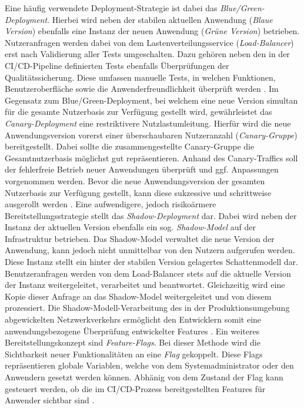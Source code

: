 Eine häufig verwendete Deployment-Strategie ist dabei das \textit{Blue/Green-Deployment}. Hierbei wird neben der stabilen aktuellen Anwendung (\textit{Blaue Version}) ebenfalls eine Instanz der neuen Anwendung (\textit{Grüne Version}) betrieben. Nutzeranfragen werden dabei von dem Lastenverteilungsservice (\textit{Load-Balancer}) erst nach Validierung aller Tests umgeschalten. Dazu gehören neben den in der CI/CD-Pipeline definierten Tests ebenfalls Überprüfungen der Qualitätssicherung. Diese umfassen manuelle Tests, in welchen Funktionen, Benutzeroberfläche sowie die Anwenderfreundlichkeit überprüft werden \cite{Ugochi.20220503}. Im Gegensatz zum Blue/Green-Deployment, bei welchem eine neue Version simultan für die gesamte Nutzerbasis zur Verfügung gestellt wird, gewährleistet das \textit{Canary-Deployment} eine restriktivere Nutzlastumleitung. Hierfür wird die neue Anwendungsversion vorerst einer überschaubaren Nutzeranzahl (\textit{Canary-Gruppe}) bereitgestellt. Dabei sollte die zusammengestellte Canary-Gruppe die Gesamtnutzerbasis möglichst gut repräsentieren. Anhand des Canary-Traffics soll der fehlerfreie Betrieb neuer Anwendungen überprüft und ggf. Anpassungen vorgenommen werden. Bevor die neue Anwendungsversion der gesamten Nutzerbasis zur Verfügung gestellt, kann diese sukzessive und schrittweise ausgerollt werden \cite{Ugochi.20220503}. Eine aufwendigere, jedoch risikoärmere Bereitstellungsstrategie stellt das \textit{Shadow-Deployment} dar. Dabei wird neben der Instanz der aktuellen Version ebenfalls ein sog. \textit{Shadow-Model} auf der Infrastruktur betrieben. Das Shadow-Model verwaltet die neue Version der Anwendung, kann jedoch nicht unmittelbar von den Nutzern aufgerufen werden. Diese Instanz stellt ein hinter der stabilen Version gelagertes Schattenmodell dar. Benutzeranfragen werden von dem Load-Balancer stets auf die aktuelle Version der Instanz weitergeleitet, verarbeitet und beantwortet. Gleichzeitig wird eine Kopie dieser Anfrage an das Shadow-Model weitergeleitet und von diesem prozessiert. Die Shadow-Modell-Verarbeitung des in der Produktionsumgebung abgewickelten Netzwerkverkehrs ermöglicht den Entwicklern somit eine anwendungsbezogene Überprüfung entwickelter Features \cite{Ugochi.20220503}. Ein weiteres Bereitstellungskonzept sind \textit{Feature-Flags}. Bei dieser Methode wird die Sichtbarkeit neuer Funktionalitäten an eine \textit{Flag} gekoppelt. Diese Flags repräsentieren globale Variablen, welche von dem Systemadministrator oder den Anwendern gesetzt werden können. Abhänig von dem Zustand der Flag kann gesteuert werden, ob die im CI/CD-Prozess bereitgestellten Features für Anwender sichtbar sind \cite{Atlassian.20230409}.